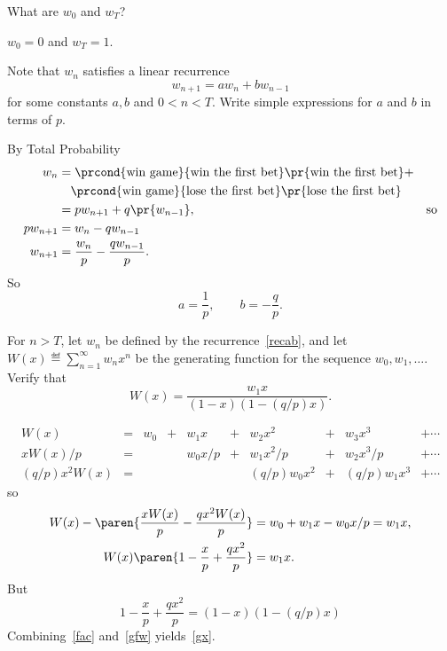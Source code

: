 \begin{problem}
\bparts

\ppart  What are $w_0$ and $w_T$?

\begin{solution}
$w_0 = 0$ and $w_T=1$.
\end{solution}

\ppart Note that $w_n$ satisfies a linear recurrence
\begin{equation}\label{recab}
w_{n+1} = aw_{n}+bw_{n-1}
\end{equation}
for some constants $a,b$ and $0 < n < T$.  Write simple expressions for
$a$ and $b$ in terms of $p$.

\begin{solution}
By Total Probability
\begin{align}
w_n & = \prcond{\text{win game}}{\text{win the first bet}}\pr{\text{win the first
   bet}} +\\
    & \quad \prcond{\text{win game}}{\text{lose the first bet}}\pr{\text{lose the first bet}}\notag\\
   & = pw_{n+1}+q\pr{w_{n-1}}, & \text{so}\notag\\
pw_{n+1} & = w_n - qw_{n-1}\notag\\
w_{n+1} & = \frac{w_n}{p} - \frac{qw_{n-1}}{p}.\label{wrec}
\end{align}
So
\[
a = \frac{1}{p}, \qquad b= - \frac{q}{p}.
\]
\end{solution}

\ppart For $n>T$, let $w_n$ be defined by the recurrence~\eqref{recab},
and let $W(x) \eqdef \sum_{n=1}^\infty w_nx^n$ be the generating function
for the sequence $w_0,w_1,\dots$.  Verify that
\begin{equation}\label{gx}
W(x) = \frac{w_1 x}{(1-x)(1-(q/p)x)}.
\end{equation}

\begin{solution}
\[\begin{array}{rclclclclc}
W(x)          & = & w_0 & + & w_1x   & + & w_2x^2       & + & w_3x^3       & + \cdots\\
xW(x)/p       & = &     &   & w_0x/p & + & w_1x^2/p     & + & w_2x^3/p     & + \cdots\\
(q/p)x^2W(x) & = &     &   &        &    & (q/p)w_0x^2  & + & (q/p)w_1x^3 & + \cdots
\end{array}\]
so
\begin{align}
W(x) - \paren{\frac{xW(x)}{p} - \frac{qx^2W(x)}{p}} & = w_0 + w_1x - w_0 x/p =
w_1x,\notag\\
W(x)\paren{ 1 - \frac{x}{p} + \frac{qx^2}{p}} & = w_1 x.\label{gfw}
\end{align}
But
\begin{equation}\label{fac}
1 - \frac{x}{p} + \frac{qx^2}{p} = (1-x)(1-(q/p)x)
\end{equation}
Combining~\eqref{fac} and~\eqref{gfw} yields~\eqref{gx}.%


\end{solution}
\end{problem}
